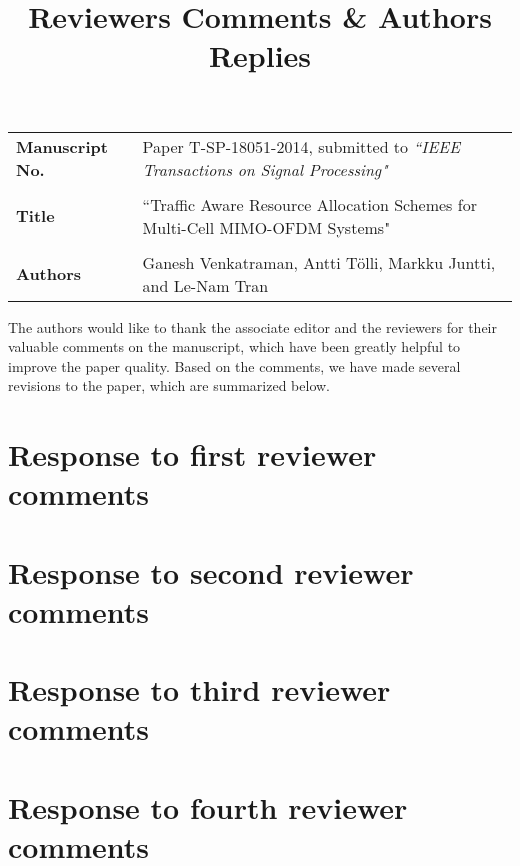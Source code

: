 \documentclass[10pt,letterpaper,onecolumn]{article}
\begin{document}
\title{Reviewers Comments \& Authors Replies}

\date{}
\maketitle

\begin{tabular}{p{1.25in}p{4.25in}}
\textbf{Manuscript No.} & Paper T-SP-18051-2014, submitted to \emph{``IEEE Transactions on Signal Processing"} \\ \\
\textbf{Title} & ``Traffic Aware Resource Allocation Schemes for Multi-Cell MIMO-OFDM Systems" \\ \\
\textbf{Authors} & Ganesh Venkatraman, Antti T\"{o}lli, Markku Juntti, and Le-Nam Tran
\end{tabular}

\vspace{0.5in}
The authors would like to thank the associate editor and the reviewers for their valuable comments on the manuscript, which have been greatly helpful to improve the paper quality. Based on the comments, we have made several revisions to the paper, which are summarized below. 


\newpage
\section*{Response to first reviewer comments}


\newpage
\section*{Response to second reviewer comments}


\newpage
\section*{Response to third reviewer comments}


\newpage
\section*{Response to fourth reviewer comments}

\end{document}

